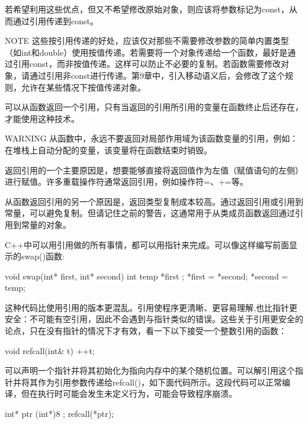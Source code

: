 若希望利用这些优点，但又不希望修改原始对象，则应该将参数标记为const，从而通过引用传递到const。

\begin{myNotic}{NOTE}
这些按引用传递的好处，应该仅对那些不需要修改参数的简单内置类型（如int和double）使用按值传递。若需要将一个对象传递给一个函数，最好是通过引用const，而非按值传递。这样可以防止不必要的复制。若函数需要修改对象，请通过引用非const进行传递。第9章中，引入移动语义后，会修改了这个规则，允许在某些情况下按值传递对象。
\end{myNotic}


可以从函数返回一个引用，只有当返回的引用所引用的变量在函数终止后还存在，才能使用这种技术。

\begin{myWarning}{WARNING}
从函数中，永远不要返回对局部作用域为该函数变量的引用，例如：在堆栈上自动分配的变量，该变量将在函数结束时销毁。
\end{myWarning}

返回引用的一个主要原因是，想要能够直接将返回值作为左值（赋值语句的左侧）进行赋值。许多重载操作符通常返回引用，例如操作符=、+=等。

从函数返回引用的另一个原因是，返回类型复制成本较高。通过返回引用或引用到常量，可以避免复制。但请记住之前的警告，这通常用于从类成员函数返回通过引用到常量的对象。


C++中可以用引用做的所有事情，都可以用指针来完成。可以像这样编写前面显示的swap()函数:

\begin{cpp}
void swap(int* first, int* second)
{
    int temp { *first };
    *first = *second;
    *second = temp;
}
\end{cpp}

这种代码比使用引用的版本更混乱。引用使程序更清晰、更容易理解,也比指针更安全：不可能有空引用，因此不会遇到与指针类似的错误。这些关于引用更安全的论点，只在没有指针的情况下才有效，看一下以下接受一个整数引用的函数：

\begin{cpp}
void refcall(int& t) { ++t; }
\end{cpp}

可以声明一个指针并将其初始化为指向内存中的某个随机位置。可以解引用这个指针并将其作为引用参数传递给refcall()，如下面代码所示。这段代码可以正常编译，但在执行时可能会发生未定义行为，可能会导致程序崩溃。

\begin{cpp}
int* ptr { (int*)8 };
refcall(*ptr);
\end{cpp}

